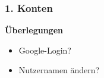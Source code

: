 \documentclass[aspectratio=1610]{beamer}
\begin{document}
	\begin{frame}[plain]
	\frametitle{1. Konten}
	\begin{minipage}{0.5\textwidth}
	\setlength{\fboxsep}{0pt}%
	\setlength{\fboxrule}{1pt}%
	\captionsetup{labelformat=empty}
	\centering
	\end{minipage}%
	\begin{minipage}{0.5\textwidth}
		\textbf{Überlegungen}
		\begin{itemize}
			\item<2->[--] Google-Login?
			\item<2->[--] Nutzernamen ändern?
		\end{itemize}
	\end{minipage}
	\end{frame}

\end{document}
